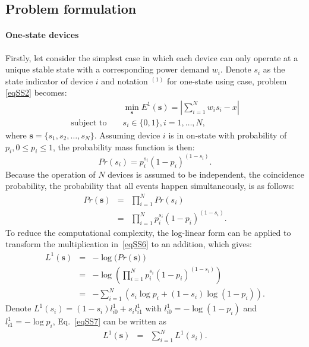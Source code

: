 
\subsection{Problem formulation}

\paragraph*{One-state devices}
Firstly, let consider the simplest case in which each device can only operate at a unique stable state with a corresponding power demand $w_i$. Denote $s_i$ as the state indicator of device $i$ and notation $^{(1)}$ for one-state using case, problem \eqref{eqSS2} becomes:
\begin{eqnarray}\label{eqSS3}
& &\min_{\mathbf{s}}{E^1(\mathbf{s})=\left |\sum_{i=1}^N{w_is_i}-x\right |}\\
\mbox{subject to } & &s_i\in \{0,1\}, i=1,\ldots ,N, \nonumber
\end{eqnarray}
where $\mathbf{s} = \{s_1,s_2,\ldots ,s_N\}$.
Assuming device $i$ is in on-state with probability of $p_i,0\leq p_i\leq 1$, the probability mass function is then:
\begin{equation}\label{eqSS4}
Pr(s_i) = p_i^{s_i}(1-p_i)^{(1-s_i)}.
\end{equation}
%
Because the operation of $N$ devices is assumed to be independent, the coincidence probability, the probability that all events happen simultaneously, is as follows:
\begin{eqnarray}\label{eqSS6}
Pr(\mathbf{s})& =& \prod_{i=1}^N{Pr(s_i)}\nonumber \\
&=&\prod_{i=1}^N{p_i^{s_i}(1-p_i)^{(1-s_i)}}.
\end{eqnarray}
To reduce the computational complexity, the log-linear form can be applied to transform the multiplication in~\eqref{eqSS6} to an addition, which gives:
\begin{eqnarray}\label{eqSS7}
L^1(\mathbf{s}) &=& -\log{(Pr\left(\mathbf{s})\right)} \nonumber \\
&=&-\log{\left( \prod_{i=1}^N{p_i^{s_i}(1-p_i)^{(1-s_i)}}\right)}\nonumber \\
&=& -\sum_{i=1}^N{\left(s_i\log{p_i}+(1-s_i)\log{(1-p_i)}\right)}.
\end{eqnarray}
Denote $L^1(s_i) = (1-s_i) l^1_{i0}+s_i l^1_{i1}$ with $l^1_{i0} = -\log{(1-p_i)}$ and $l^1_{i1} = -\log{p_i}$, Eq.~\eqref{eqSS7} can be written as
\begin{eqnarray}
L^1(\mathbf{s}) &=& \sum_{i=1}^N{L^1(s_i)}.
\end{eqnarray}
